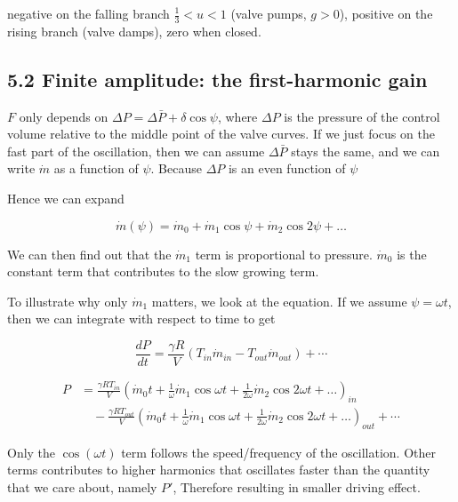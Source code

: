\documentclass[11pt]{article}
\begin{document}
negative on the falling branch $\frac13 < u < 1$ (valve pumps, $g > 0$), positive on the rising branch (valve damps), zero when closed.

\subsection*{5.2 Finite amplitude: the first-harmonic gain}

$F$ only depends on $\Delta P = \Delta \bar{P} + \delta \cos\psi$, where $\Delta P$ is the pressure of the control volume relative to the middle point of the valve curves. If we just focus on the fast part of the oscillation, then we can assume $ \Delta \bar{P}$ stays the same, and we can write $\dot m$ as a function of $\psi$. Because $\Delta P$ is an even function of $\psi$

Hence we can expand

\[
\dot m(\psi) = \dot m_{0} + \dot m_{1} \cos \psi + \dot m_{2} \cos 2 \psi + \ldots
\]

We can then find out that the $\dot m_1$ term is proportional to pressure. $\dot m_0$ is the constant term that contributes to the slow growing term.

To illustrate why only $\dot m_1$ matters, we look at the equation. If we assume $\psi = \omega t$, then we can integrate with respect to time to get

\[
\frac{d P}{d t}=\frac{\gamma R}{V}\left(T_{in} \dot m_{in} - T_{out} \dot m_{out}\right) + \cdots
\]

\begin{align*}
P &= \frac{\gamma R T_{in}}{V}\left(\dot m_0 t + \frac{1}{\omega} \dot m_1 \cos \omega t + \frac{1}{2\omega} \dot m_2 \cos 2 \omega t + \ldots\right)_{in} \\
&\quad - \frac{\gamma R T_{out}}{V} \left(\dot m_0 t + \frac{1}{\omega} \dot m_1 \cos \omega t + \frac{1}{2\omega} \dot m_2 \cos 2 \omega t + \ldots\right)_{out} + \cdots
\end{align*}

Only the $\cos(\omega t)$ term follows the speed/frequency of the oscillation. Other terms contributes to higher harmonics that oscillates faster than the quantity that we care about, namely $P'$, Therefore resulting in smaller driving effect.
\end{document}
